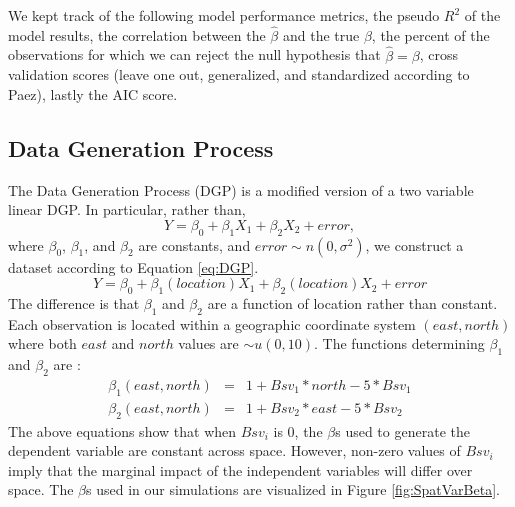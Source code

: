 \documentclass{article}\usepackage{graphicx, color}
\begin{document}
We kept track of the following model performance metrics, the pseudo $R^2$ of the model results, the correlation between the $\hat{\beta}$ and the true $\beta$, the percent of the observations for which we can reject the null hypothesis that $\hat{\beta}=\beta$, cross validation scores (leave one out, generalized, and standardized according to Paez), lastly the AIC score.

\subsection{Data Generation Process}

The Data Generation Process (DGP) is a modified version of a two variable linear DGP. In particular, rather than,
\begin{equation}
Y = \beta _0 + \beta _1 X_1 + \beta _2 X_2 + error,
\end{equation}
where $\beta _0$, $\beta _1$, and $\beta _2$ are constants, and $error \sim n(0, \sigma ^2)$, we construct a dataset according to Equation \eqref{eq:DGP}.
\begin{equation}\label{eq:DGP}
Y = \beta _0 + \beta _1(location) X_1 + \beta _2(location) X_2 + error
\end{equation}
The difference is that $\beta _1$ and $\beta _2$ are a function of location rather than constant. Each observation is located within a geographic coordinate system $(east, north)$ where both $east$ and $north$ values are $\sim u(0, 10)$. The functions determining $\beta _1$ and $\beta _2$ are :
\begin{eqnarray}
\beta _1 (east, north) &=& 1 + Bsv_1 * north - 5*Bsv_1 \\
\beta _2 (east, north) &=& 1 + Bsv_2 * east - 5*Bsv_2
\end{eqnarray}
The above equations show that when $Bsv_i$ is 0, the $\beta$s used to generate the dependent variable are constant across space. However, non-zero values of $Bsv_i$ imply that the marginal impact of the independent variables will differ over space. The $\beta$s used in our simulations are visualized in Figure \ref{fig:SpatVarBeta}.
\end{document}
